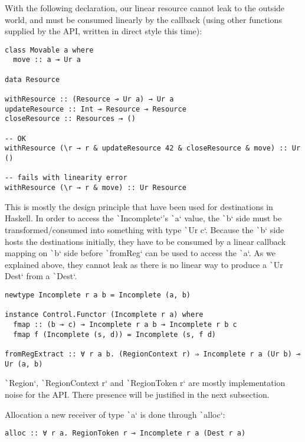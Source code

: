 \documentclass[english]{jflart}
\begin{document}
With the following declaration, our linear resource cannot leak to the outside world, and must be consumed linearly by the callback (using other functions supplied by the API, written in direct style this time):

\begin{verbatim}
class Movable a where
  move :: a ⊸ Ur a

data Resource

withResource :: (Resource ⊸ Ur a) → Ur a
updateResource :: Int ⊸ Resource ⊸ Resource
closeResource :: Resources ⊸ ()

-- OK
withResource (\r → r & updateResource 42 & closeResource & move) :: Ur ()

-- fails with linearity error
withResource (\r → r & move) :: Ur Resource
\end{verbatim}

This is mostly the design principle that have been used for destinations in Haskell. In order to access the \texttt`Incomplete`'s \texttt`a` value, the \texttt`b` side must be transformed/consumed into something with type \texttt`Ur c`. Because the \texttt`b` side hosts the destinations initially, they have to be consumed by a linear callback mapping on \texttt`b` side before \texttt`fromReg` can be used to access the \texttt`a`. As we explained above, they cannot leak as there is no linear way to produce a \texttt`Ur Dest` from a \texttt`Dest`.

\begin{verbatim}
newtype Incomplete r a b = Incomplete (a, b)

instance Control.Functor (Incomplete r a) where
  fmap :: (b ⊸ c) ⊸ Incomplete r a b ⊸ Incomplete r b c
  fmap f (Incomplete (s, d)) = Incomplete (s, f d)

fromRegExtract :: ∀ r a b. (RegionContext r) ⇒ Incomplete r a (Ur b) ⊸ Ur (a, b)
\end{verbatim}

\texttt`Region`, \texttt`RegionContext r` and \texttt`RegionToken r` are mostly implementation noise for the API. There presence will be justified in the next subsection.

Allocation a new receiver of type \texttt`a` is done through \texttt`alloc`:

\begin{verbatim}
alloc :: ∀ r a. RegionToken r ⊸ Incomplete r a (Dest r a)
\end{verbatim}
\end{document}

